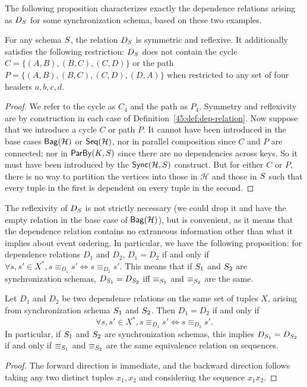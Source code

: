 The following proposition
characterizes exactly the dependence relations arising as $D_\ss$ for some
synchronization schema, based on these two examples.
\begin{proposition}
For any schema $\ss$, the relation $D_{\ss}$ is symmetric and reflexive.
It additionally satisfies the following restriction:
$D_{\ss}$ does not contain the cycle $C = \{(A, B), (B, C), (C, D)\}$
or the path $P = \{(A, B), (B, C), (C, D), (D, A)\}$ when restricted
to any set of four headers $a, b, c, d$.
\end{proposition}
\begin{proof}
We refer to the cycle as $C_4$ and the path as $P_4$.
Symmetry and reflexivity are by construction in each case of Definition~\ref{45:def:dep-relation}.
Now suppose that we introduce a cycle $C$ or path $P$.
It cannot have been introduced in the base cases $\relleaf{\mathcal{H}}$
or $\seqleaf{\mathcal{H}}$,
nor in parallel composition since $C$ and $P$ are connected;
nor in $\keyby{K}{S}$ since there are no dependencies across keys.
So it must have been introduced by the $\hier{\mathcal{H}}{\ss}$ construct.
But for either $C$ or $P$, there is no way to partition the vertices into those in
$\mathcal{H}$ and those in $\ss$ such that every tuple in the first is
dependent on every tuple in the second.
\end{proof}

The reflexivity of $D_{\ss}$ is not strictly necessary (we could drop it and have the empty relation in the base case of $\relleaf{\mathcal{H}}$), but is convenient, as it means that the dependence relation contains no extraneous information other than what it implies about event ordering.
In particular,
we have the following proposition:
for dependence relations $D_1$ and $D_2$, $D_1 = D_2$ if and only if
$\forall s, s' \in X^{*}, s \equiv_{D_1} s' \iff s \equiv_{D_2} s'$.
This means that if $\ss_1$ and $\ss_2$ are synchronization schemas,
$D_{\ss_1} = D_{\ss_2}$ iff $\equiv_{\ss_1}$ and $\equiv_{\ss_2}$ are the same.

\begin{proposition}
Let $D_1$ and $D_2$ be two dependence relations on the same set of tuples $X$,
arising from synchronization schema $\ss_1$ and $\ss_2$.
Then $D_1 = D_2$ if and only if
\[
    \forall s, s' \in X^{*}, s \equiv_{D_1} s' \iff s \equiv_{D_2} s'.
\]
In particular, if $\ss_1$ and $\ss_2$ are synchronization schemas, this implies
$D_{\ss_1} = D_{\ss_2}$ if and only if $\equiv_{\ss_1}$ and $\equiv_{\ss_2}$ are the same equivalence relation on sequences.
\end{proposition}
\begin{proof}
The forward direction is immediate, and the backward direction follows
taking any two distinct tuples $x_1, x_2$ and considering the sequence $x_1 x_2$.
\end{proof}

